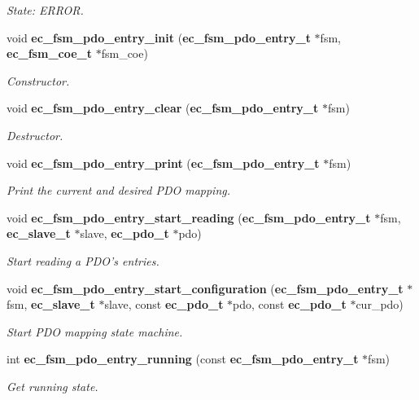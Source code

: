 \begin{DoxyCompactItemize}
\begin{DoxyCompactList}\small\item\em \-State\-: \-E\-R\-R\-O\-R. \end{DoxyCompactList}\item 
void {\bf ec\-\_\-fsm\-\_\-pdo\-\_\-entry\-\_\-init} ({\bf ec\-\_\-fsm\-\_\-pdo\-\_\-entry\-\_\-t} $\ast$fsm, {\bf ec\-\_\-fsm\-\_\-coe\-\_\-t} $\ast$fsm\-\_\-coe)
\begin{DoxyCompactList}\small\item\em \-Constructor. \end{DoxyCompactList}\item 
void {\bf ec\-\_\-fsm\-\_\-pdo\-\_\-entry\-\_\-clear} ({\bf ec\-\_\-fsm\-\_\-pdo\-\_\-entry\-\_\-t} $\ast$fsm)
\begin{DoxyCompactList}\small\item\em \-Destructor. \end{DoxyCompactList}\item 
void {\bf ec\-\_\-fsm\-\_\-pdo\-\_\-entry\-\_\-print} ({\bf ec\-\_\-fsm\-\_\-pdo\-\_\-entry\-\_\-t} $\ast$fsm)
\begin{DoxyCompactList}\small\item\em \-Print the current and desired \-P\-D\-O mapping. \end{DoxyCompactList}\item 
void {\bf ec\-\_\-fsm\-\_\-pdo\-\_\-entry\-\_\-start\-\_\-reading} ({\bf ec\-\_\-fsm\-\_\-pdo\-\_\-entry\-\_\-t} $\ast$fsm, {\bf ec\-\_\-slave\-\_\-t} $\ast$slave, {\bf ec\-\_\-pdo\-\_\-t} $\ast$pdo)
\begin{DoxyCompactList}\small\item\em \-Start reading a \-P\-D\-O's entries. \end{DoxyCompactList}\item 
void {\bf ec\-\_\-fsm\-\_\-pdo\-\_\-entry\-\_\-start\-\_\-configuration} ({\bf ec\-\_\-fsm\-\_\-pdo\-\_\-entry\-\_\-t} $\ast$fsm, {\bf ec\-\_\-slave\-\_\-t} $\ast$slave, const {\bf ec\-\_\-pdo\-\_\-t} $\ast$pdo, const {\bf ec\-\_\-pdo\-\_\-t} $\ast$cur\-\_\-pdo)
\begin{DoxyCompactList}\small\item\em \-Start \-P\-D\-O mapping state machine. \end{DoxyCompactList}\item 
int {\bf ec\-\_\-fsm\-\_\-pdo\-\_\-entry\-\_\-running} (const {\bf ec\-\_\-fsm\-\_\-pdo\-\_\-entry\-\_\-t} $\ast$fsm)
\begin{DoxyCompactList}\small\item\em \-Get running state. \end{DoxyCompactList}\item 

\end{DoxyCompactItemize}
